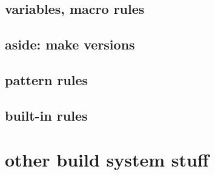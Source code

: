 \subsection{variables, macro rules}



\subsection{aside: make versions}



\subsection{pattern rules}



\subsection{built-in rules}



\section{other build system stuff}




